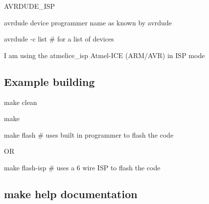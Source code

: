 A\+V\+R\+D\+U\+D\+E\+\_\+\+I\+SP
\begin{DoxyItemize}
\item avrdude device programmer name as known by avrdude
\begin{DoxyItemize}
\item avrdude -\/c list \# for a list of devices
\end{DoxyItemize}
\item I am using the atmelice\+\_\+isp Atmel-\/\+I\+CE (A\+R\+M/\+A\+VR) in I\+SP mode
\end{DoxyItemize}

\subsection*{Example building}


\begin{DoxyItemize}
\item make clean
\item make
\item make flash \# uses built in programmer to flash the code
\begin{DoxyItemize}
\item OR
\begin{DoxyItemize}
\item make flash-\/isp \# uses a 6 wire I\+SP to flash the code
\end{DoxyItemize}
\end{DoxyItemize}
\end{DoxyItemize}

\subsection*{make help documentation}


